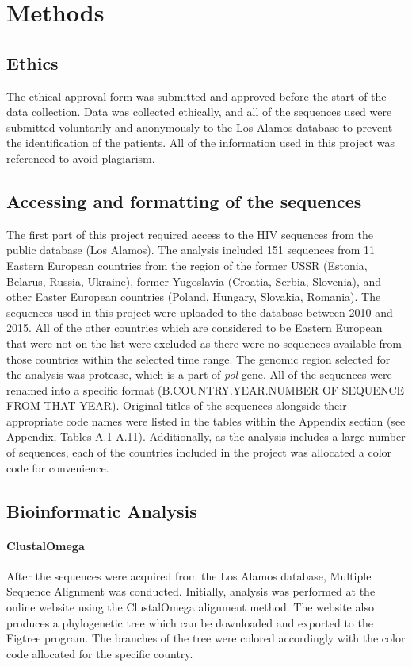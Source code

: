 \chapter{Methods}

\section{Ethics}
The ethical approval form was submitted and approved before the start of the data collection. 
Data was collected ethically, and all of the sequences used were submitted voluntarily and anonymously to the Los Alamos database to prevent the identification of the patients. 
All of the information used in this project was referenced to avoid plagiarism.

\section{Accessing and formatting of the sequences}
The first part of this project required access to the HIV sequences from the public database (Los Alamos). 
The analysis included 151 sequences from 11 Eastern European countries from the region of the former USSR (Estonia, Belarus, Russia, Ukraine), former Yugoslavia (Croatia, Serbia, Slovenia), and other Easter European countries (Poland, Hungary, Slovakia, Romania). The sequences used in this project were uploaded to the database between 2010 and 2015.
All of the other countries which are considered to be Eastern European that were not on the list were excluded as there were no sequences available from those countries within the selected time range. 
The genomic region selected for the analysis was protease, which is a part of \textit{pol} gene. 
All of the sequences were renamed into a specific format (B.COUNTRY.YEAR.NUMBER OF SEQUENCE FROM THAT YEAR). Original titles of the sequences alongside their appropriate code names were listed in the tables within the Appendix section (see Appendix, Tables A.1-A.11).
Additionally, as the analysis includes a large number of sequences, each of the countries included in the project was allocated a color code for convenience.

\vfill

\section{Bioinformatic Analysis}

\subsubsection{ClustalOmega}
After the sequences were acquired from the Los Alamos database, Multiple Sequence Alignment was conducted.
Initially, analysis was performed at the online website using the ClustalOmega alignment method. 
The website also produces a phylogenetic tree which can be downloaded and exported to the Figtree program. 
The branches of the tree were colored accordingly with the color code allocated for the specific country.\\
